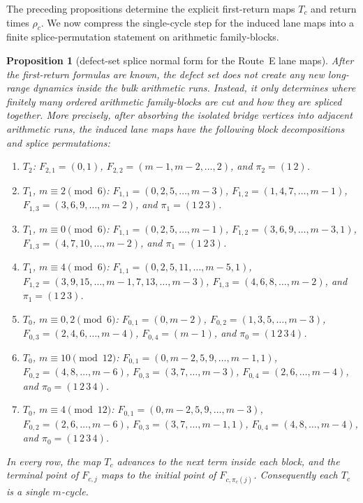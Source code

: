 \documentclass[11pt]{article}
\newtheorem{proposition}{Proposition}
\begin{document}
The preceding propositions determine the explicit first-return maps $T_c$ and return times $\rho_c$.
We now compress the single-cycle step for the induced lane maps into a finite splice-permutation statement on arithmetic family-blocks.

\begin{proposition}[defect-set splice normal form for the Route~E lane maps]\label{prop:routeE-splice}
After the first-return formulas are known, the defect set does not create any new long-range dynamics inside the bulk arithmetic runs.
Instead, it only determines where finitely many ordered arithmetic family-blocks are cut and how they are spliced together.
More precisely, after absorbing the isolated bridge vertices into adjacent arithmetic runs, the induced lane maps have the following block decompositions and splice permutations:

{\small
\begin{enumerate}[label=\textup{(\roman*)},leftmargin=2.4em,itemsep=0.25em,topsep=0.35em]
\item $T_2$: $F_{2,1}=(0,1)$, $F_{2,2}=(m-1,m-2,\dots,2)$, and $\pi_2=(1\,2)$.
\item $T_1$, $m\equiv 2\pmod 6$: $F_{1,1}=(0,2,5,\dots,m-3)$, $F_{1,2}=(1,4,7,\dots,m-1)$, $F_{1,3}=(3,6,9,\dots,m-2)$, and $\pi_1=(1\,2\,3)$.
\item $T_1$, $m\equiv 0\pmod 6$: $F_{1,1}=(0,2,5,\dots,m-1)$, $F_{1,2}=(3,6,9,\dots,m-3,1)$, $F_{1,3}=(4,7,10,\dots,m-2)$, and $\pi_1=(1\,2\,3)$.
\item $T_1$, $m\equiv 4\pmod 6$: $F_{1,1}=(0,2,5,11,\dots,m-5,1)$, $F_{1,2}=(3,9,15,\dots,m-1,7,13,\dots,m-3)$, $F_{1,3}=(4,6,8,\dots,m-2)$, and $\pi_1=(1\,2\,3)$.
\item $T_0$, $m\equiv 0,2\pmod 6$: $F_{0,1}=(0,m-2)$, $F_{0,2}=(1,3,5,\dots,m-3)$, $F_{0,3}=(2,4,6,\dots,m-4)$, $F_{0,4}=(m-1)$, and $\pi_0=(1\,2\,3\,4)$.
\item $T_0$, $m\equiv 10\pmod{12}$: $F_{0,1}=(0,m-2,5,9,\dots,m-1,1)$, $F_{0,2}=(4,8,\dots,m-6)$, $F_{0,3}=(3,7,\dots,m-3)$, $F_{0,4}=(2,6,\dots,m-4)$, and $\pi_0=(1\,2\,3\,4)$.
\item $T_0$, $m\equiv 4\pmod{12}$: $F_{0,1}=(0,m-2,5,9,\dots,m-3)$, $F_{0,2}=(2,6,\dots,m-6)$, $F_{0,3}=(3,7,\dots,m-1,1)$, $F_{0,4}=(4,8,\dots,m-4)$, and $\pi_0=(1\,2\,3\,4)$.
\end{enumerate}
}

In every row, the map $T_c$ advances to the next term inside each block, and the terminal point of $F_{c,j}$ maps to the initial point of $F_{c,\pi_c(j)}$.
Consequently each $T_c$ is a single $m$-cycle.
\end{proposition}
\end{document}
